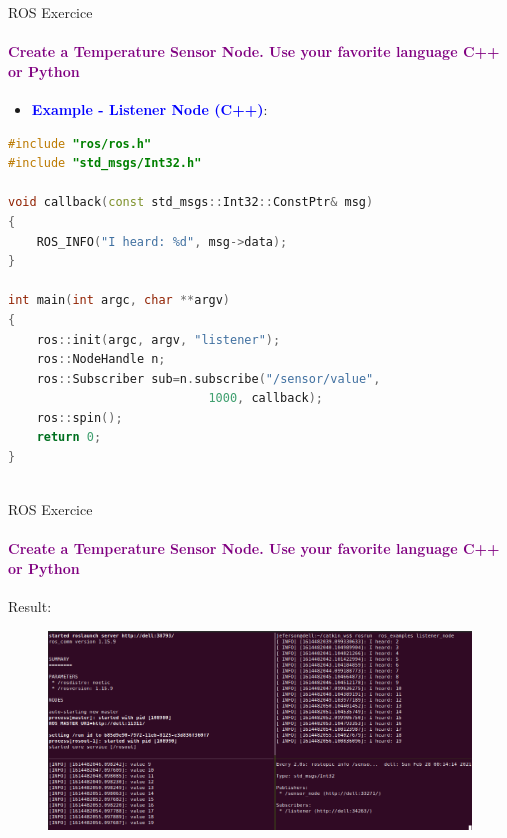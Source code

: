 \documentclass[aspectratio=169]{beamer}
\begin{document}
\begin{frame}[fragile]{ROS Exercice}
	\framesubtitle{\textcolor{purple}{Create a Temperature Sensor Node. Use your favorite language C++ or Python}}
	\begin{minipage}{0.6\textwidth}
	\begin{itemize}
		\item \textcolor{blue}{\textbf{Example - Listener Node (C++)}}:
	\end{itemize}
	\begin{lstlisting}[language=C++]
#include "ros/ros.h"
#include "std_msgs/Int32.h"

void callback(const std_msgs::Int32::ConstPtr& msg)
{
	ROS_INFO("I heard: %d", msg->data);
}

int main(int argc, char **argv)
{
	ros::init(argc, argv, "listener");
	ros::NodeHandle n;
	ros::Subscriber sub=n.subscribe("/sensor/value", 
							1000, callback);
	ros::spin();
	return 0;
}
	
    \end{lstlisting}
\end{minipage}
\begin{minipage}{0.4\textwidth}
	
\end{minipage}
\end{frame}


\begin{frame}{ROS Exercice}
	\framesubtitle{\textcolor{purple}{Create a Temperature Sensor Node. Use your favorite language C++ or Python}}
	Result:
	\begin{figure}
		\includegraphics[width=1\textwidth]{./images/ros_sensor_example.png}
	\end{figure}
\end{frame}
\end{document}
